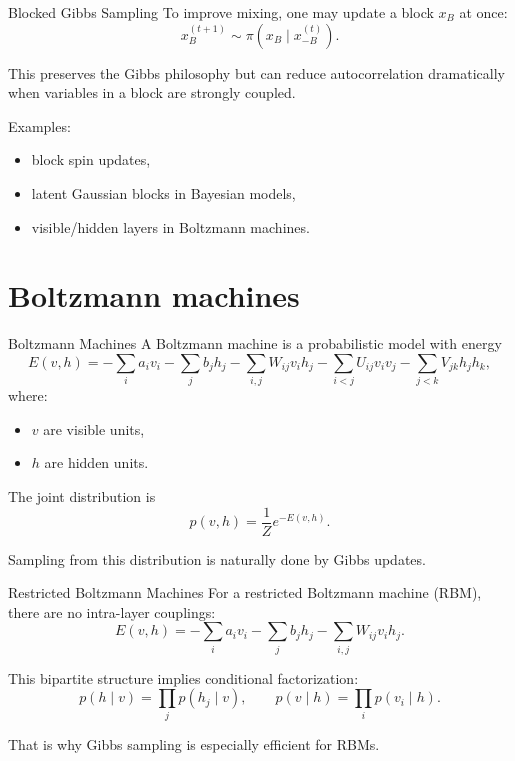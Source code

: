 \documentclass[aspectratio=169]{beamer}
\begin{document}
\begin{frame}{Blocked Gibbs Sampling}
To improve mixing, one may update a block \(x_B\) at once:
\[
x_B^{(t+1)}\sim \pi(x_B\mid x_{-B}^{(t)}).
\]

This preserves the Gibbs philosophy but can reduce autocorrelation dramatically when variables in a block are strongly coupled.

Examples:
\begin{itemize}
    \item block spin updates,
    \item latent Gaussian blocks in Bayesian models,
    \item visible/hidden layers in Boltzmann machines.
\end{itemize}
\end{frame}

\section{Boltzmann machines}

\begin{frame}{Boltzmann Machines}
A Boltzmann machine is a probabilistic model with energy
\[
E(v,h)
=
-\sum_i a_i v_i
-\sum_j b_j h_j
-\sum_{i,j} W_{ij} v_i h_j
-\sum_{i<j} U_{ij} v_i v_j
-\sum_{j<k} V_{jk} h_j h_k,
\]
where:
\begin{itemize}
    \item \(v\) are visible units,
    \item \(h\) are hidden units.
\end{itemize}

The joint distribution is
\[
p(v,h)=\frac{1}{Z}e^{-E(v,h)}.
\]

Sampling from this distribution is naturally done by Gibbs updates.
\end{frame}

\begin{frame}{Restricted Boltzmann Machines}
For a restricted Boltzmann machine (RBM), there are no intra-layer couplings:
\[
E(v,h)
=
-\sum_i a_i v_i
-\sum_j b_j h_j
-\sum_{i,j} W_{ij} v_i h_j.
\]

This bipartite structure implies conditional factorization:
\[
p(h\mid v)=\prod_j p(h_j\mid v),
\qquad
p(v\mid h)=\prod_i p(v_i\mid h).
\]

That is why Gibbs sampling is especially efficient for RBMs.
\end{frame}
\end{document}
